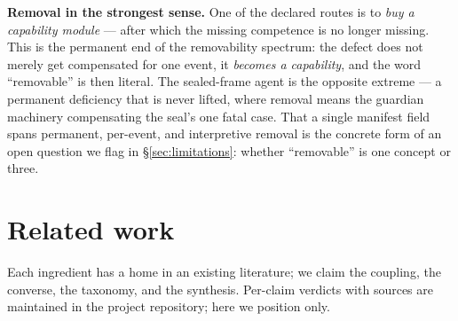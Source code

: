 \documentclass[11pt]{article}
\theoremstyle{plain}
\theoremstyle{definition}
\begin{document}
\textbf{Removal in the strongest sense.} One of the declared routes is to \emph{buy a
capability module} --- after which the missing competence is no longer missing.
This is the permanent end of the removability spectrum: the defect does not
merely get compensated for one event, it \emph{becomes a capability}, and the word
``removable'' is then literal. The sealed-frame agent is the opposite extreme ---
a permanent deficiency that is never lifted, where removal means the guardian
machinery compensating the seal's one fatal case. That a single manifest field
spans permanent, per-event, and interpretive removal is the concrete form of an
open question we flag in \S\ref{sec:limitations}: whether ``removable'' is one concept or three.

\section{Related work}\label{sec:related}

Each ingredient has a home in an existing literature; we claim the coupling,
the converse, the taxonomy, and the synthesis. Per-claim verdicts with
sources are maintained in the project repository; here we position only.
\end{document}
